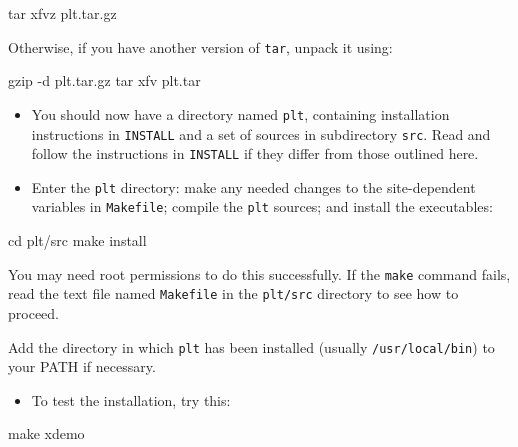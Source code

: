 \documentclass{book}
\begin{document}
\begin{center}
\begin{boxedverbatim}
tar xfvz plt.tar.gz
\end{boxedverbatim}
\end{center}

\hspace{1em}
Otherwise, if you have another version of {\tt tar}, unpack it using:
\begin{center}
\begin{boxedverbatim}
gzip -d plt.tar.gz
tar xfv plt.tar
\end{boxedverbatim}
\end{center}

\begin{itemize}
\item
You should now have a directory named {\tt plt}, containing installation
instructions in {\tt INSTALL} and a set of sources in subdirectory {\tt src}.
Read and follow the instructions in {\tt INSTALL} if they differ from those
outlined here.

\item
Enter the {\tt plt} directory: make any needed changes to the
site-dependent variables in {\tt Makefile}; compile the {\tt plt} sources;
and install the executables:
\end{itemize}

\begin{center}
\begin{boxedverbatim}
cd plt/src
make install
\end{boxedverbatim}
\end{center}

You may need root permissions to do this successfully.  If the {\tt make}
command fails, read the text file named {\tt Makefile} in the {\tt plt/src}
directory to see how to proceed.

Add the directory in which {\tt plt} has been installed (usually
{\tt /usr/local/bin}) to your PATH if necessary.

\begin{itemize}
\item
To test the installation, try this:
\end{itemize}

\begin{center}
\begin{boxedverbatim}
make xdemo
\end{boxedverbatim}
\end{center}
\end{document}
